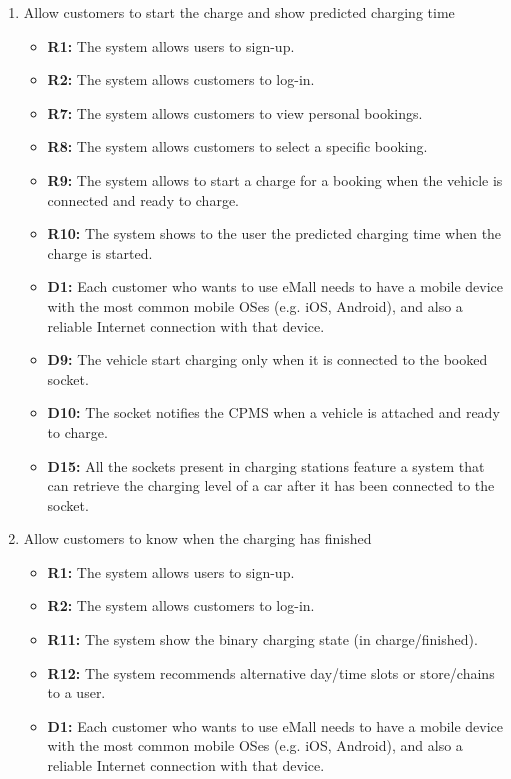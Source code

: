 \begin{enumerate}[label=\textbf{-G\arabic*}:]
{\begin{itemize}
          \end{itemize}
          }
    \item {Allow customers to start the charge and show predicted charging time
          \begin{itemize}
            \item \textbf{R1:} The system allows users to sign-up.
            \item \textbf{R2:} The system allows customers to log-in.
            \item \textbf{R7:} The system allows customers to view personal bookings.
            \item \textbf{R8:} The system allows customers to select a specific booking.
            \item \textbf{R9:} The system allows to start a charge for a booking when the vehicle is connected and ready to charge.
            \item \textbf{R10:} The system shows to the user the predicted charging time when the charge is started.
            \item \textbf{D1:} Each customer who wants to use eMall needs to have a mobile device with the most common mobile OSes (e.g. iOS, Android), and also a reliable Internet connection with that device.
            \item \textbf{D9:} The vehicle start charging only when it is connected to the booked socket.
            \item \textbf{D10:} The socket notifies the CPMS when a vehicle is attached and ready to charge.
            \item \textbf{D15:} All the sockets present in charging stations feature a system that can retrieve the charging level of a car after it has been connected to the socket.
          \end{itemize}
          }
    \item {Allow customers to know when the charging has finished
          \begin{itemize}
            \item \textbf{R1:} The system allows users to sign-up.
            \item \textbf{R2:} The system allows customers to log-in.
            \item \textbf{R11:} The system show the binary charging state (in charge/finished).
            \item \textbf{R12:} The system recommends alternative day/time slots or store/chains to a user.
            \item \textbf{D1:} Each customer who wants to use eMall needs to have a mobile device with the most common mobile OSes (e.g. iOS, Android), and also a reliable Internet connection with that device.

\end{itemize}}
\end{enumerate}
